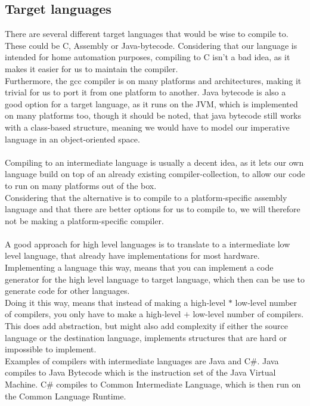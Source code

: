 \subsection{Target languages}\label{CodeGen:TargetLanguage}
There are several different target languages that would be wise to compile to. These could be C, Assembly or Java-bytecode. Considering that our language is intended for home automation purposes, compiling to C isn't a bad idea, as it makes it easier for us to maintain the compiler.\\
Furthermore, the gcc compiler is on many platforms and architectures, making it trivial for us to port it from one platform to another. Java bytecode is also a good option for a target language, as it runs on the JVM, which is implemented on many platforms too, though it should be noted, that java bytecode still works with a class-based structure, meaning we would have to model our imperative language in an object-oriented space.
\\\\
Compiling to an intermediate language is usually a decent idea, as it lets our own language build on top of an already existing compiler-collection, to allow our code to run on many platforms out of the box.\\
Considering that the alternative is to compile to a platform-specific assembly language and that there are better options for us to compile to, we will therefore not be making a platform-specific compiler.
\\\\
A good approach for high level languages is to translate to a intermediate low level language, that already have implementations for most hardware.\\
Implementing a language this way, means that you can implement a code generator for the high level language to target language, which then can be use to generate code for other languages.\\
Doing it this way, means that instead of making a high-level $*$ low-level number of compilers, you only have to make a high-level $+$ low-level number of compilers.\\
This does add abstraction, but might also add complexity if either the source language or the destination language, implements structures that are hard or impossible to implement.\\
Examples of compilers with intermediate languages are Java and C\#. Java compiles to Java Bytecode which is the instruction set of the Java Virtual Machine. C\# compiles to Common Intermediate Language, which is then run on the Common Language Runtime.

